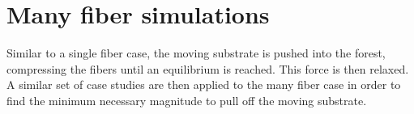 \chapter{Many fiber simulations} \label{chap:four}

Similar to a single fiber case, the moving substrate is pushed into the forest, compressing the fibers until an equilibrium is reached. This force is then relaxed. A similar set of case studies are then applied to the many fiber case in order to find the minimum necessary magnitude to pull off the moving substrate.